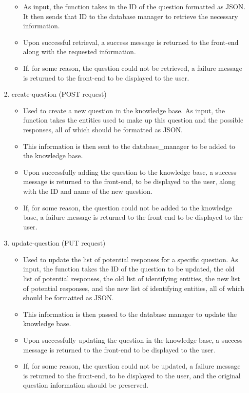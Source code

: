 \documentclass[titlepage, 12pt]{article}
\begin{document}
\begin{enumerate}
\begin{itemize}
        \item As input, the function takes in the ID of the question formatted as JSON. It then sends that ID to the database manager to retrieve the necessary information.
        \item Upon successful retrieval, a success message is returned to the front-end along with the requested information.
        \item If, for some reason, the question could not be retrieved, a failure message is returned to the front-end to be displayed to the user.
    \end{itemize}
    \item create-question (POST request)
    \begin{itemize}
        \item Used to create a new question in the knowledge base. As input, the function takes the entities used to make up this question and the possible responses, all of which should be formatted as JSON.
        \item This information is then sent to the database\_manager to be added to the knowledge base.
        \item Upon successfully adding the question to the knowledge base, a success message is returned to the front-end, to be displayed to the user, along with the ID and name of the new question.
        \item If, for some reason, the question could not be added to the knowledge base, a failure message is returned to the front-end to be displayed to the user.
    \end{itemize}
    \item update-question (PUT request)
    \begin{itemize}
        \item Used to update the list of potential responses for a specific question. As input, the function takes the ID of the question to be updated, the old list of potential responses, the old list of identifying entities, the new list of potential responses, and the new list of identifying entities, all of which should be formatted as JSON.
        \item This information is then passed to the database manager to update the knowledge base.
        \item Upon successfully updating the question in the knowledge base, a success message is returned to the front-end to be displayed to the user.
        \item If, for some reason, the question could not be updated, a failure message is returned to the front-end, to be displayed to the user, and the original question information should be preserved.

\end{itemize}
\end{enumerate}
\end{document}
